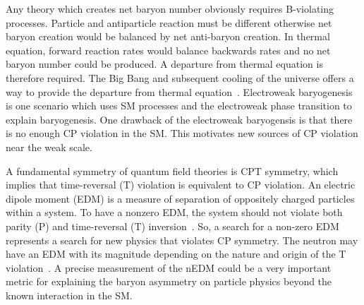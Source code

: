 Any theory which creates net baryon number obviously requires B-violating processes. Particle and antiparticle reaction must be different otherwise net baryon creation would be balanced by net anti-baryon creation. In thermal equation, forward reaction rates would balance backwards rates and no net baryon number could be produced. A departure from thermal equation is therefore required. The Big Bang and subsequent cooling of the universe offers a way to provide the departure from thermal equation~\cite{sakharov_3rd_cond}. Electroweak baryogenesis is one scenario which uses SM processes and the electroweak phase transition to explain baryogenesis. One drawback of the electroweak baryogensis is that there is no enough CP violation in the SM. This motivates new sources of CP violation near the weak scale.


A fundamental symmetry of quantum field theories is CPT symmetry, which implies that time-reversal (T) violation is equivalent to CP violation.  An electric dipole moment (EDM) is a measure of separation of oppositely charged particles within a system. To have a nonzero EDM, the system should not violate both parity (P) and time-reversal (T) inversion~\cite{edm_reason}. So, a search for a non-zero EDM represents a search for new physics that violates CP symmetry. The neutron may have an EDM with its magnitude depending on the nature and origin of the T violation~\cite{nEDM_reason}. A precise measurement of the nEDM could be a very important metric for explaining the baryon asymmetry on particle physics beyond the known interaction in the SM. 

